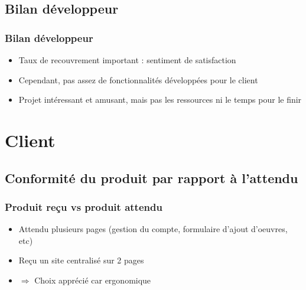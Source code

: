 \documentclass{beamer}
\begin{document}
    \subsection{Bilan développeur}
    \begin{frame}
      \frametitle{Bilan développeur}
      \begin{block}{}
        \begin{itemize}
          \item Taux de recouvrement important : sentiment de satisfaction
          \item Cependant, pas assez de fonctionnalités développées pour le client
          \item Projet intéressant et amusant, mais pas les ressources ni le temps pour le finir
        \end{itemize}
      \end{block}
    \end{frame}
    
  \section{Client}
  
    \begin{frame}
    	\tableofcontents[currentsection]
    \end{frame}
  
    \subsection{Conformité du produit par rapport à l'attendu}
    \begin{frame}
      \frametitle{Produit reçu vs produit attendu}
      \begin{block}{}
        \begin{itemize}
          \item Attendu plusieurs pages (gestion du compte, formulaire d'ajout d'oeuvres, etc)
          \item Reçu un site centralisé sur 2 pages
          \item $ \Rightarrow $ Choix apprécié car ergonomique
        \end{itemize}
      \end{block}    
    \end{frame}
    
\end{document}
